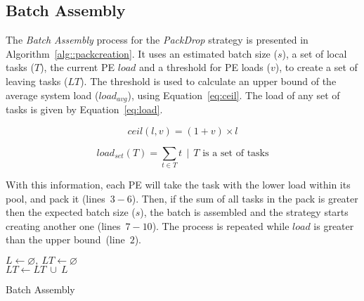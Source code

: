\subsection{Batch Assembly} \label{sec:algo:creation}

The \textit{Batch Assembly} process for the \textit{PackDrop} strategy is presented in Algorithm~\ref{alg::packcreation}.
It uses an estimated batch size ($s$), a set of local tasks ($T$), the current PE $load$ and a threshold for PE loads ($v$), to create a set of leaving tasks ($LT$).
The threshold is used to calculate an upper bound of the average system load ($load_{avg}$), using Equation~\ref{eq:ceil}. 
The load of any set of tasks is given by Equation~\ref{eq:load}.

\begin{equation}
	ceil(l,v) = (1+v)\times l
    \label{eq:ceil}
\end{equation}

\begin{equation}
	load_{set}(T) = \sum_{t \in T}t\ \ |\ \ T \text{ is a set of tasks}
	\label{eq:load}
\end{equation}

With this information, each PE will take the task with the lower load within its pool, and pack it (lines~$3-6$).
Then, if the sum of all tasks in the pack is greater then the expected batch size ($s$), the batch is assembled and the strategy starts creating another one (lines~$7-10$).
The process is repeated while $load$ is greater than the upper bound~(line~$2$).

\begin{algorithm}[!ht]
    \DontPrintSemicolon
    $L \gets \varnothing,\ LT \gets \varnothing$ \\
    $LT \gets LT\ \cup\ L$   
    \caption{Batch Assembly} 
    \label{alg::packcreation}
\end{algorithm}

